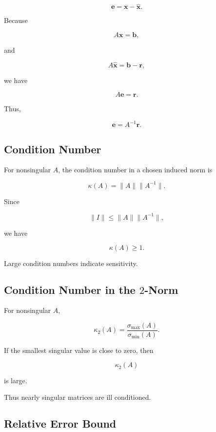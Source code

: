 \[
\boxed{
\mathbf{e}
=
\mathbf{x}
-
\widehat{\mathbf{x}}.
}
\]

Because

\[
A\mathbf{x}
=
\mathbf{b},
\]

and

\[
A\widehat{\mathbf{x}}
=
\mathbf{b}
-
\mathbf{r},
\]

we have

\[
\boxed{
A\mathbf{e}
=
\mathbf{r}.
}
\]

Thus,

\[
\boxed{
\mathbf{e}
=
A^{-1}\mathbf{r}.
}
\]

\subsection{Condition Number}
\label{subsec:matrix-condition-number}

For nonsingular \(A\), the condition number in a chosen induced norm is

\[
\boxed{
\kappa(A)
=
\|A\|
\|A^{-1}\|.
}
\]

Since

\[
\|I\|
\leq
\|A\|
\|A^{-1}\|,
\]

we have

\[
\boxed{
\kappa(A)\geq1.
}
\]

Large condition numbers indicate sensitivity.

\subsection{Condition Number in the \(2\)-Norm}
\label{subsec:condition-number-two-norm}

For nonsingular \(A\),

\[
\boxed{
\kappa_2(A)
=
\frac{
\sigma_{\max}(A)
}{
\sigma_{\min}(A)
}.
}
\]

If the smallest singular value is close to zero, then

\[
\kappa_2(A)
\]

is large.

Thus nearly singular matrices are ill conditioned.

\subsection{Relative Error Bound}
\label{subsec:linear-relative-error-bound}

